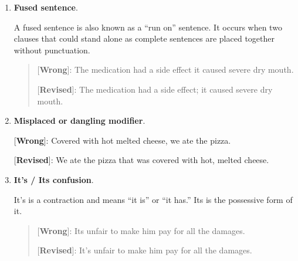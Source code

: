 \begin{enumerate}
\item \textbf{Fused sentence}.

A fused sentence is also known as a ``run on'' sentence. It occurs when two clauses that could stand alone as complete sentences are placed together without punctuation.
 
 \begin{quote}
[\textbf{Wrong}]: The medication had a side effect it caused severe dry mouth. 

[\textbf{Revised}]: The medication had a side effect; it caused severe dry mouth. 
\end{quote}

\item \textbf{Misplaced or dangling modifier}.

	[\textbf{Wrong}]: Covered with hot melted cheese, we ate the pizza. 
	
	[\textbf{Revised}]: We ate the pizza that was covered with hot, melted cheese. 
	
\item \textbf{It's / Its confusion}.

It's is a contraction and means ``it is'' or ``it has.'' Its is the possessive form of it.

\begin{quote}
[\textbf{Wrong}]: Its unfair to make him pay for all the damages. 

[\textbf{Revised}]: It's unfair to make him pay for all the damages. 
\end{quote}

\end{enumerate}

